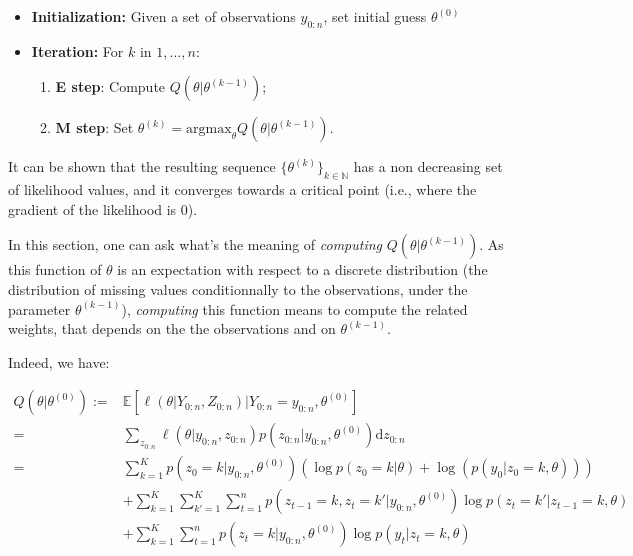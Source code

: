 \documentclass[
]{book}
\providecommand{\tightlist}{%
  \setlength{\itemsep}{0pt}\setlength{\parskip}{0pt}}
\begin{document}
\begin{itemize}
\tightlist
\item
  \textbf{Initialization:} Given a set of observations \(y_{0:n}\), set initial guess \(\theta^{(0)}\)
\item
  \textbf{Iteration:} For \(k\) in \(1,\dots, n\):

  \begin{enumerate}
  \def\labelenumi{\arabic{enumi}.}
  \tightlist
  \item
    \textbf{E step}: Compute \(Q(\theta \vert \theta^{(k-1)})\);
  \item
    \textbf{M step}: Set \(\theta^{(k)} = \text{argmax}_\theta Q(\theta \vert \theta^{(k-1)})\).
  \end{enumerate}
\end{itemize}

It can be shown that the resulting sequence \(\lbrace\theta^{(k)} \rbrace_{k \in \mathbb{N}}\) has a non decreasing set of likelihood values, and it converges towards a critical point (i.e., where the gradient of the likelihood is 0).

In this section, one can ask what's the meaning of \emph{computing} \(Q(\theta \vert \theta^{(k-1)})\).
As this function of \(\theta\) is an expectation with respect to a discrete distribution (the distribution of missing values conditionnally to the observations, under the parameter \(\theta^{(k-1)}\)), \emph{computing} this function means to compute the related weights, that depends on the the observations and on \(\theta^{(k-1)}\).

Indeed, we have:

\begin{align}
Q(\theta \vert \theta^{(0)}) :=& \mathbb{E}[\ell(\theta \vert Y_{0:n}, Z_{0:n}) \vert Y_{0:n} = y_{0:n}, \theta^{(0)}]\nonumber \\
=& \sum_{z_{0:n}} \ell(\theta \vert y_{0:n}, z_{0:n}) p(z_{0:n} \vert y_{0:n}, \theta^{(0)}) \text{d} z_{0:n} \nonumber \\
=& \sum_{k = 1}^K p(z_0 = k \vert y_{0:n}, \theta^{(0)})\left(\log p(z_0 = k \vert \theta) + \log(p(y_0 \vert z_0 = k, \theta))\right)  \nonumber \\
& + \sum_{k = 1}^K\sum_{k' = 1}^K \sum_{t = 1}^n p(z_{t-1} = k, z_{t} = k'\vert y_{0:n}, \theta^{(0)}) \log p(z_{t} = k' \vert z_{t - 1} = k,\theta) \nonumber \\
& + \sum_{k = 1}^K \sum_{t = 1}^n p(z_t = k\vert y_{0:n}, \theta^{(0)}) \log p(y_{t} \vert z_{t} = k, \theta) \nonumber
\end{align}
\end{document}
